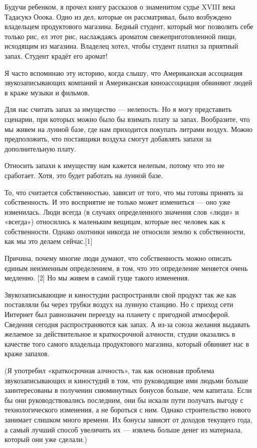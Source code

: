 \documentclass[ebook,12pt,oneside,openany]{memoir}
\begin{document}
\maketitle

Будучи ребенком, я прочел книгу рассказов о знаменитом судье XVIII
века Тадасукэ Ооока. Одно из дел, которые он рассматривал, было
возбуждено владельцем продуктового магазина. Бедный студент, который
мог позволить себе только рис, ел этот рис, наслаждаясь ароматом
свежеприготовленной пищи, исходящим из магазина. Владелец хотел, чтобы
студент платил за приятный запах. Студент крадёт его аромат!

Я часто вспоминаю эту историю, когда слышу, что Американская
ассоциация звукозаписывающих компаний и Американская киноассоциация
обвиняют людей в краже музыки и фильмов.

Для нас считать запах за имущество — нелепость. Но я могу представить
сценарии, при которых можно было бы взимать плату за запах.
Вообразите, что мы живем на лунной базе, где нам приходится покупать
литрами воздух. Можно предположить, что поставщики воздуха смогут
добавлять запахи за дополнительную плату.

Относить запахи к имуществу нам кажется нелепым, потому что это не
сработает. Хотя, это будет работать на лунной базе.

То, что считается собственностью, зависит от того, что мы готовы
принять за собственность. И это восприятие не только может измениться
— оно уже изменилась. Люди всегда (в случаях определенного значения
слов «люди» и «всегда») относились к маленьким вещицам, которые нес
человек как к собственности. Однако охотники никогда не относили землю
к собственности, как мы это делаем сейчас.[1]


Причина, почему многие люди думают, что собственность можно описать
единым неизменным определением, в том, что это определение меняется
очень медленно. [2] Но мы живем в самой гуще такого изменения.

Звукозаписывающие и киностудии распространяли свой продукт так же как
поставляли бы через трубки воздух на лунную станцию. Но с приход сети
Интернет был равнозначен переезду на планету с пригодной атмосферой.
Сведения сегодня распространяются как запах. А из-за союза желания
выдавать желаемое за действительное и краткосрочной алчности, студии
оказались в качестве того самого владельца продуктового магазина,
который обвиняет нас в краже запахов.

(Я употребил «краткосрочная алчность», так как основная проблема
звукозаписывающих и киностудий в том, что руководящие ими людьми
больше заинтересованы в получении сиюминутных бонусов больше, чем
капитала. Если бы они руководствовались последним, они бы искали пути
получать выгоду с технологического изменения, а не бороться с ним.
Однако строительство нового занимает слишком много времени. Их бонусы
зависят от доходов текущего года, а самый лучший способ увеличить их —
извлечь больше денег из материала, который они уже сделали.)
\end{document}
